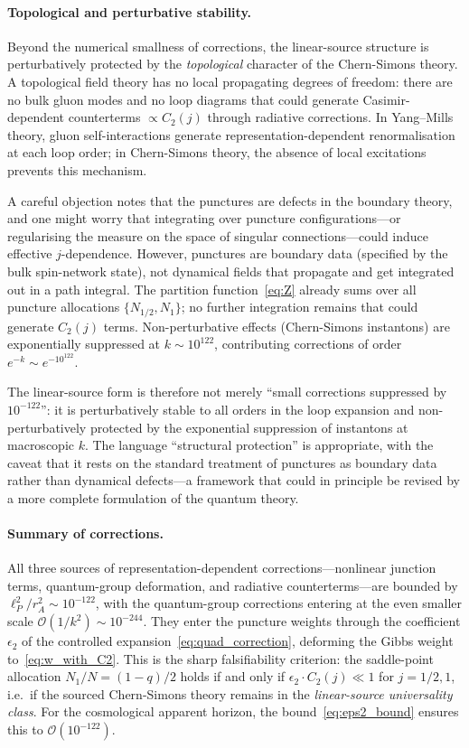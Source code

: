 \documentclass[aps,prd,twocolumn,10pt,superscriptaddress,nofootinbib]{revtex4-2}
\begin{document}
\paragraph{Topological and perturbative stability.}

Beyond the numerical smallness of corrections, the linear-source
structure is perturbatively protected by the \emph{topological}
character of the Chern-Simons theory.  A topological field theory
has no local propagating degrees of freedom: there are no bulk
gluon modes and no loop diagrams that could generate
Casimir-dependent counterterms $\propto C_2(j)$ through
radiative corrections.  In Yang--Mills theory, gluon
self-interactions generate representation-dependent
renormalisation at each loop order; in Chern-Simons theory, the
absence of local excitations prevents this mechanism.

A careful objection notes that the punctures are defects in the
boundary theory, and one might worry that integrating over
puncture configurations---or regularising the measure on the
space of singular connections---could induce effective
$j$-dependence.  However, punctures are boundary data (specified
by the bulk spin-network state), not dynamical fields that
propagate and get integrated out in a path integral.  The
partition function~\eqref{eq:Z} already sums over all puncture
allocations $\{N_{1/2}, N_1\}$; no further integration remains
that could generate $C_2(j)$ terms.  Non-perturbative effects
(Chern-Simons instantons) are exponentially suppressed at
$k \sim 10^{122}$, contributing corrections of order
$e^{-k} \sim e^{-10^{122}}$.

The linear-source form is therefore not merely ``small corrections
suppressed by $10^{-122}$'': it is perturbatively stable to all
orders in the loop expansion and non-perturbatively protected by
the exponential suppression of instantons at macroscopic $k$.
The language ``structural protection'' is appropriate, with the
caveat that it rests on the standard treatment of punctures as
boundary data rather than dynamical defects---a framework that
could in principle be revised by a more complete formulation of
the quantum theory.

\paragraph{Summary of corrections.}

All three sources of representation-dependent corrections---nonlinear
junction terms, quantum-group deformation, and radiative
counterterms---are bounded by $\ell_P^2/r_A^2 \sim 10^{-122}$,
with the quantum-group corrections entering at the even smaller
scale $\mathcal{O}(1/k^2) \sim 10^{-244}$.  They enter the
puncture weights
through the coefficient $\epsilon_2$ of the controlled
expansion~\eqref{eq:quad_correction}, deforming the Gibbs weight
to~\eqref{eq:w_with_C2}.  This is the sharp falsifiability
criterion: the saddle-point allocation $N_1/N = (1-q)/2$ holds if
and only if $\epsilon_2 \cdot C_2(j) \ll 1$ for $j = 1/2, 1$,
i.e.\ if the sourced Chern-Simons theory remains in the
\emph{linear-source universality class}.  For the cosmological
apparent horizon, the bound~\eqref{eq:eps2_bound} ensures this to
$\mathcal{O}(10^{-122})$.
\end{document}
